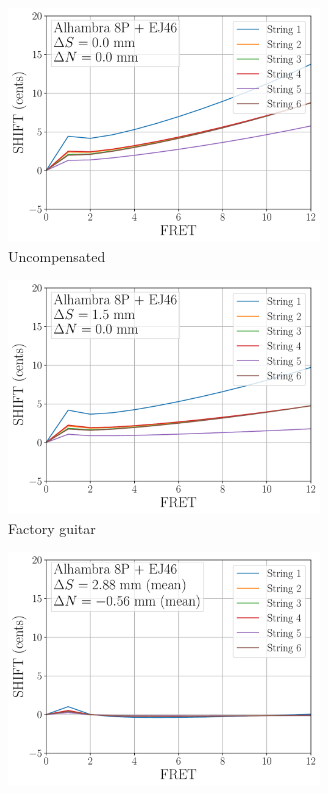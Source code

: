  \begin{figure}
  \centering
  \begin{subfigure}[b]{0.45\textwidth}
   \centering
   \includegraphics[width=3.25in]{figures/shift_alhambra8p_ej46_null}
   \caption{Uncompensated}
   \label{fig:shift_alhambra8p_ej46_null}
  \end{subfigure}
  \hspace{0.25in}
  \begin{subfigure}[b]{0.45\textwidth}
   \centering
   \includegraphics[width=3.25in]{figures/shift_alhambra8p_ej46_factory}
   \caption{Factory guitar}
   \label{fig:shift_alhambra8p_ej46_factory}
  \end{subfigure}
  \par\vspace{0.25in}
  \begin{subfigure}[b]{0.45\textwidth}
   \centering
   \includegraphics[width=3.25in]{figures/shift_alhambra8p_ej46_full}

\end{subfigure}
\end{figure}

